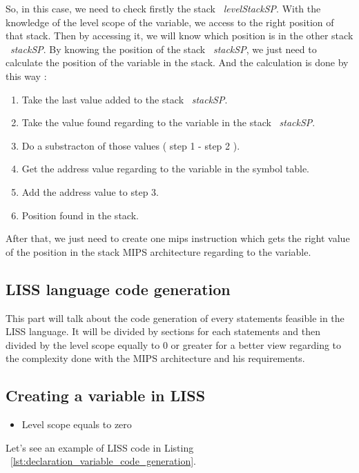\documentclass[
  oneside,
  11pt, a4paper,
  footinclude=true,
  headinclude=true,
  cleardoublepage=empty
]{scrbook}
\begin{document}
So, in this case, we need to check firstly the stack ~\textit{levelStackSP}. With the knowledge of the level scope of the variable, we access to the right position of that stack. Then by accessing it, we will know which position is in the other stack ~\textit{stackSP}.
By knowing the position of the stack ~\textit{stackSP}, we just need to calculate the position of the variable in the stack.
And the calculation is done by this way :

\begin{enumerate}
\item Take the last value added to the stack ~\textit{stackSP}.
\item Take the value found regarding to the variable in the stack ~\textit{stackSP}.
\item Do a substracton of those values ( step 1 - step 2 ).
\item Get the address value regarding to the variable in the symbol table.
\item Add the address value to step 3.
\item Position found in the stack.
\end{enumerate}

After that, we just need to create one mips instruction which gets the right value of the position in the stack MIPS architecture regarding to the variable.

\subsection{LISS language code generation}

This part will talk about the code generation of every statements feasible in the LISS language.
It will be divided by sections for each statements and then divided by the level scope equally to 0 or greater for a better view regarding to the complexity done with the MIPS architecture and his requirements.

\subsection{Creating a variable in LISS}

\begin{itemize}
\item Level scope equals to zero
\end{itemize}

Let's see an example of LISS code in Listing ~\ref{lst:declaration_variable_code_generation}.
\end{document}
